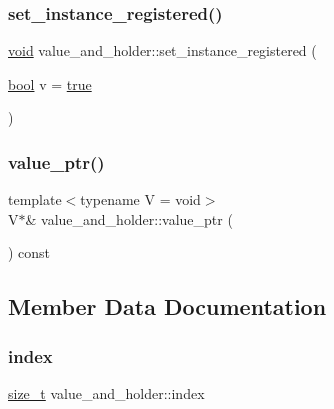 \subsubsection{\texorpdfstring{set\_instance\_registered()}{set\_instance\_registered()}}
{\footnotesize\ttfamily \mbox{\hyperlink{_s_d_l__opengles2__gl2ext_8h_ae5d8fa23ad07c48bb609509eae494c95}{void}} value\+\_\+and\+\_\+holder\+::set\+\_\+instance\+\_\+registered (\begin{DoxyParamCaption}\item[{\mbox{\hyperlink{asdl_8h_af6a258d8f3ee5206d682d799316314b1}{bool}}}]{v = {\ttfamily \mbox{\hyperlink{asdl_8h_af6a258d8f3ee5206d682d799316314b1a08f175a5505a10b9ed657defeb050e4b}{true}}} }\end{DoxyParamCaption})\hspace{0.3cm}{\ttfamily [inline]}}

\mbox{\label{structvalue__and__holder_af3c728355ac1f2716f409bfc3b9183b9}} 
\subsubsection{\texorpdfstring{value\_ptr()}{value\_ptr()}}
{\footnotesize\ttfamily template$<$typename V  = void$>$ \\
V$\ast$\& value\+\_\+and\+\_\+holder\+::value\+\_\+ptr (\begin{DoxyParamCaption}{ }\end{DoxyParamCaption}) const\hspace{0.3cm}{\ttfamily [inline]}}



\subsection{Member Data Documentation}
\mbox{\label{structvalue__and__holder_a6e3af37221790786ae747e41e5d4f4c9}} 
\subsubsection{\texorpdfstring{index}{index}}
{\footnotesize\ttfamily \mbox{\hyperlink{detail_2common_8h_a801d6a451a01953ef8cbae6feb6a3638}{size\+\_\+t}} value\+\_\+and\+\_\+holder\+::index}

